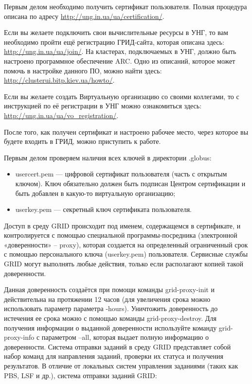 \documentclass[10pt, a5paper]{article}
\begin{document}
Первым делом необходимо получить сертификат пользователя. Полная процедура описана по адресу \url{http://ung.in.ua/ua/certification/}.

Если вы желаете подключить свои вычислительные ресурсы в УНГ, то вам необходимо пройти ещё регистрацию ГРИД-сайта, которая описана здесь: \url{http://ung.in.ua/ua/join/}. На кластерах, подключаемых в УНГ, должно быть настроено программное обеспечение ARC. Одно из описаний, которое может помочь в настройке данного ПО, можно найти здесь: \url{http://clusterui.bitp.kiev.ua/howto/}.

Если вы желаете создать Виртуальную организацию со своими коллегами, то с инструкцией по её регистрации в УНГ можно ознакомиться здесь: \url{http://ung.in.ua/ua/vo_registration/}.

После того, как получен сертификат и настроено рабочее место, через которое вы будете входить в ГРИД, можно приступить к работе.

Первым делом проверяем наличия всех ключей в директории .globus:

\begin{itemize}
  \item usercert.pem --- цифровой сертификат пользователя (часть с открытым ключом). Ключ обязательно должен быть подписан Центром сертификации и быть добавлен в какую-то виртуальную организацию;
  \item userkey.pem --- секретный ключ сертификата пользователя.
\end{itemize}

Доступ в среду GRID происходит под именем, содержащемся в сертификате, и контролируется  с помощью специальной программы-посредника (электронной «доверенности» – proxy), которая создается на определенный ограниченный срок с помощью персонального ключа (userkey.pem) пользователя. Сервисные службы GRID могут выполнять любые действия, только если располагают копией такой доверенности.

Данная доверенность создаётся при помощи команды grid-proxy-init и действительна на протяжении  12 часов (для увеличения срока можно использовать параметр параметра -hours). Уничтожить доверенность до истечения ее срока можно с помощью команды grid-proxy-destroy. Для получения информации о выданной доверенности используйте команду grid-proxy-info с параметром –all, которая выдает полную информацию о доверенности.
Система отправки заданий в среду GRID представляет собой набор команд для направления заданий, проверки их статуса и получения результатов. В отличие от локальных систем управления заданиями (таких как PBS, LSF и др.), система отправки заданий GRID:
\end{document}
